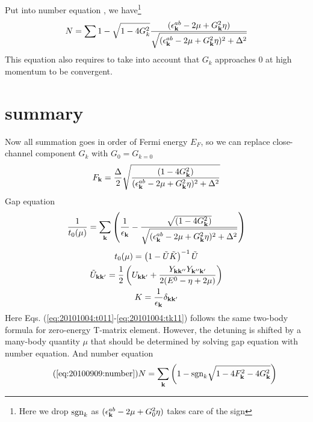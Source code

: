 Put  into number equation , we have\footnote{Here we drop $\text{sgn}_{k}$ as $(\epsilon^{ab}_{\mathbf{k}}-2\mu+  G_{0}^2\eta)$ takes care of the sign}
\begin{equation}\label{eq:20101011:number}
N=\sum{1-\sqrt{1-4G_{k}^{2}}\frac{(\epsilon^{ab}_{\ensuremath{\mathbf{k}}}-2\mu+  G_{\ensuremath{\mathbf{k}}}^2\eta)}{{\sqrt{{(\epsilon^{ab}_{\ensuremath{\mathbf{k}}}-2\mu+  G_{\ensuremath{\mathbf{k}}}^2\eta)^{2}+\Delta^{2}}}}}}
\end{equation}
This equation also requires to take into account that $G_{k}$ approaches 0 at high momentum to be convergent.
\section{summary}
Now all summation goes in order of Fermi energy $E_F$, so we can replace close-channel component $G_k$ with $G_0=G_{k=0}$
\begin{equation}
F_{\mathbf{k}}=\frac{\Delta}2\sqrt{\frac{(1-4G_{\mathbf{k}}^{2})}{(\epsilon^{ab}_{\mathbf{k}}-2\mu+  G_{\mathbf{k}}^2\eta)^{2}+\Delta^{2}}}
\end{equation}
Gap equation 
\begin{equation}\label{eq:20101004:gapS}
\frac{1}{{t_{0}}(\mu)}=\sum_{\mathbf{k}}
\left(\frac{1}{\epsilon_{\mathbf{k}}}-\frac{\sqrt{(1-4G_{\mathbf{k}}^{2})}}{\sqrt{{(\epsilon^{ab}_{\mathbf{k}}-2\mu+  G_{\mathbf{k}}^2\eta)^{2}+\Delta^{2}}}}\right)
\end{equation} 
\begin{gather}
{t_{0}}(\mu)=\left(1-\tilde{U}\tilde{ K}\right)^{-1}\tilde{U}\label{eq:20101004:t011}\\
\tilde{U}_{\mathbf{k}\mathbf{k}'}=\frac{1}{2} \left(U_{\mathbf{k}\mathbf{k}'}+\frac{Y_{\mathbf{k}\mathbf{k}''}Y_{\mathbf{k}''\mathbf{k}'}}{2(E^{0}-\eta+2\mu)}\right)\label{eq:20101004:tu11}\\
{K}=\frac{1}{\epsilon_{\mathbf{k}}}\delta_{\mathbf{k}\mathbf{k}'}\label{eq:20101004:tk11}
\end{gather}
Here Eqs. (\ref{eq:20101004:t011}-\ref{eq:20101004:tk11}) follows the same two-body formula for zero-energy T-matrix element.  However, the detuning is shifted by a many-body quantity $\mu$ that should be determined by solving gap equation with number equation.  
And number equation
\begin{equation}\tag{\ref{eq:20100909:number}}
N=\sum_{\vk} \left(1-\sgn_{k}\sqrt{1-4 F_{\vk}^2-4 G_{\vk}^2}\right)
\end{equation} 

